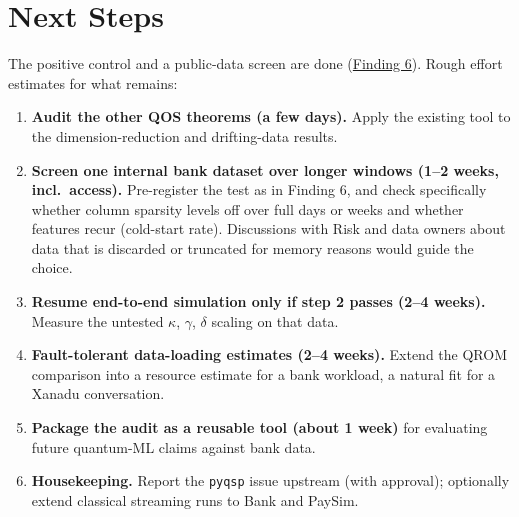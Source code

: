 \documentclass[10pt]{article}
\newenvironment{sectionblock}
{%
    \par
    \vspace{2pt}
    \noindent
    \begin{minipage}{\textwidth}
}
{%
    \end{minipage}
    \par
    \vspace{5pt}
}
\begin{document}
\begin{sectionblock}

\section{Next Steps}
\label{sec:next}

The positive control and a public-data screen are done (\hyperref[sec:f6]{Finding 6}). Rough effort estimates for what remains:

\begin{enumerate}
    \item \textbf{Audit the other QOS theorems (a few days).} Apply the existing tool to the dimension-reduction and drifting-data results.
    \item \textbf{Screen one internal bank dataset over longer windows (1--2 weeks, incl.\ access).} Pre-register the test as in Finding 6, and check specifically whether column sparsity levels off over full days or weeks and whether features recur (cold-start rate). Discussions with Risk and data owners about data that is discarded or truncated for memory reasons would guide the choice.
    \item \textbf{Resume end-to-end simulation only if step 2 passes (2--4 weeks).} Measure the untested $\kappa$, $\gamma$, $\delta$ scaling on that data.
    \item \textbf{Fault-tolerant data-loading estimates (2--4 weeks).} Extend the QROM comparison into a resource estimate for a bank workload, a natural fit for a Xanadu conversation.
    \item \textbf{Package the audit as a reusable tool (about 1 week)} for evaluating future quantum-ML claims against bank data.
    \item \textbf{Housekeeping.} Report the \texttt{pyqsp} issue upstream (with approval); optionally extend classical streaming runs to Bank and PaySim.
\end{enumerate}

\end{sectionblock}
\end{document}
